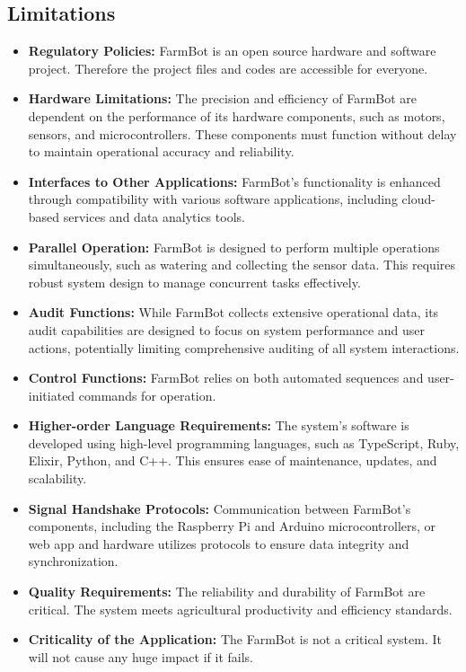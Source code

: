 \subsection{Limitations}
\begin{itemize}
    \item \textbf{Regulatory Policies:} FarmBot is an open source hardware and software project. Therefore the project files and codes are accessible for everyone.
    \item \textbf{Hardware Limitations:} The precision and efficiency of FarmBot are dependent on the performance of its hardware components, such as motors, sensors, and microcontrollers. These components must function without delay to maintain operational accuracy and reliability.
    \item \textbf{Interfaces to Other Applications:} FarmBot's functionality is enhanced through compatibility with various software applications, including cloud-based services and data analytics tools.
    \item \textbf{Parallel Operation:} FarmBot is designed to perform multiple operations simultaneously, such as watering and collecting the sensor data. This requires robust system design to manage concurrent tasks effectively.
    \item \textbf{Audit Functions:} While FarmBot collects extensive operational data, its audit capabilities are designed to focus on system performance and user actions, potentially limiting comprehensive auditing of all system interactions.
    \item \textbf{Control Functions:} FarmBot relies on both automated sequences and user-initiated commands for operation.
    \item \textbf{Higher-order Language Requirements:} The system's software is developed using high-level programming languages, such as TypeScript, Ruby, Elixir, Python, and C++. This ensures ease of maintenance, updates, and scalability.
    \item \textbf{Signal Handshake Protocols:} Communication between FarmBot's components, including the Raspberry Pi and Arduino microcontrollers, or web app and hardware utilizes protocols to ensure data integrity and synchronization.
    \item \textbf{Quality Requirements:} The reliability and durability of FarmBot are critical. The system meets agricultural productivity and efficiency standards.
    \item \textbf{Criticality of the Application:} The FarmBot is not a critical system. It will not cause any huge impact if it fails.

\end{itemize}
